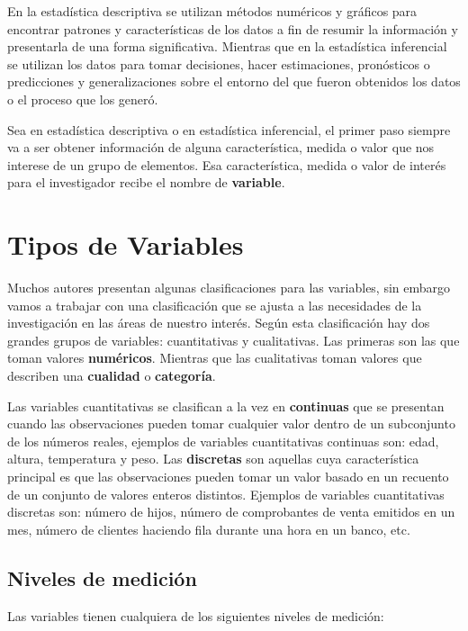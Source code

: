 \documentclass[letterpaper,]{book}
\begin{document}
En la estadística descriptiva se utilizan métodos numéricos y gráficos para encontrar patrones y características de los datos a fin de resumir la información y presentarla de una forma significativa. Mientras que en la estadística inferencial se utilizan los datos para tomar decisiones, hacer estimaciones, pronósticos o predicciones y generalizaciones sobre el entorno del que fueron obtenidos los datos o el proceso que los generó.

Sea en estadística descriptiva o en estadística inferencial, el primer paso siempre va a ser obtener información de alguna característica, medida o valor que nos interese de un grupo de elementos. Esa característica, medida o valor de interés para el investigador recibe el nombre de \textbf{variable}.

\hypertarget{tipos-de-variables}{%
\section{Tipos de Variables}\label{tipos-de-variables}}

Muchos autores presentan algunas clasificaciones para las variables, sin embargo vamos a trabajar con una clasificación que se ajusta a las necesidades de la investigación en las áreas de nuestro interés. Según esta clasificación hay dos grandes grupos de variables: cuantitativas y cualitativas. Las primeras son las que toman valores \textbf{numéricos}. Mientras que las cualitativas toman valores que describen una \textbf{cualidad} o \textbf{categoría}.

Las variables cuantitativas se clasifican a la vez en \textbf{continuas} que se presentan cuando las observaciones pueden tomar cualquier valor dentro de un subconjunto de los números reales, ejemplos de variables cuantitativas continuas son: edad, altura, temperatura y peso. Las \textbf{discretas} son aquellas cuya característica principal es que las observaciones pueden tomar un valor basado en un recuento de un conjunto de valores enteros distintos. Ejemplos de variables cuantitativas discretas son: número de hijos, número de comprobantes de venta emitidos en un mes, número de clientes haciendo fila durante una hora en un banco, etc.

\hypertarget{niveles-de-medicion}{%
\subsection{Niveles de medición}\label{niveles-de-medicion}}

Las variables tienen cualquiera de los siguientes niveles de medición:
\end{document}
